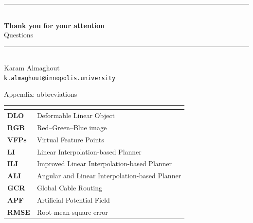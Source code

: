 \documentclass[aspectratio=169,10pt]{beamer}
\begin{document}
\begin{frame}[plain]
  \vspace*{0.72cm}
  \begin{center}
    {\color{IUBlue}\rule{0.56\textwidth}{1.0pt}}\\[0.55cm]
    {\Huge\bfseries Thank you for your attention}\\[0.42cm]
    {\Large\color{IUDeepBlue}Questions}\\[0.55cm]
    {\color{IUBlue}\rule{0.56\textwidth}{1.0pt}}\\[0.45cm]
    {\small Karam Almaghout\\
    \texttt{k.almaghout@innopolis.university}}
  \end{center}
\end{frame}

\appendix

\begin{frame}[t]{Appendix: abbreviations}
  \small
  \renewcommand{\arraystretch}{1.22}
  \setlength{\tabcolsep}{5pt}
  \begin{tabularx}{0.96\textwidth}{>{\bfseries}p{1.75cm}Y}
    \toprule
     & \\
    \midrule
    DLO & Deformable Linear Object\\
    RGB & Red--Green--Blue image\\
    VFPs & Virtual Feature Points\\
    LI & Linear Interpolation-based Planner\\
    ILI & Improved Linear Interpolation-based Planner\\
    ALI & Angular and Linear Interpolation-based Planner\\
    GCR & Global Cable Routing\\
    APF & Artificial Potential Field\\
    RMSE & Root-mean-square error\\
    \bottomrule
  \end{tabularx}
\end{frame}
\end{document}
